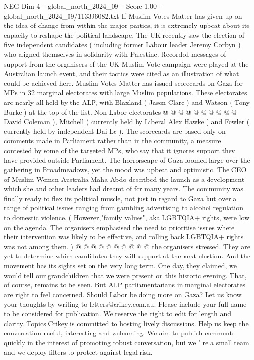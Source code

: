 \begin{textsample}{NEG Dim 4 – global\_north\_2024\_09 – Score 1.00 – global\_north\_2024\_09/113396082.txt}
If Muslim Votes Matter has given up on the idea of change from within the major parties, it is extremely upbeat about its capacity to reshape the political landscape.
The UK recently saw the election of five independent candidates ( including former Labour leader Jeremy Corbyn ) who aligned themselves in solidarity with Palestine.
Recorded messages of support from the organisers of the UK Muslim Vote campaign were played at the Australian launch event, and their tactics were cited as an illustration of what could be achieved here.
Muslim Votes Matter has issued scorecards on Gaza for MPs in 32 marginal electorates with large Muslim populations.
These electorates are nearly all held by the ALP, with Blaxland ( Jason Clare ) and Watson ( Tony Burke ) at the top of the list.
Non-Labor electorates @ @ @ @ @ @ @ @ @ @ David Coleman ), Mitchell ( currently held by Liberal Alex Hawke ) and Fowler ( currently held by independent Dai Le ).
The scorecards are based only on comments made in Parliament rather than in the community, a measure contested by some of the targeted MPs, who say that it ignores support they have provided outside Parliament.
The horrorscape of Gaza loomed large over the gathering in Broadmeadows, yet the mood was upbeat and optimistic.
The CEO of Muslim Women Australia Maha Abdo described the launch as a development which she and other leaders had dreamt of for many years.
The community was finally ready to flex its political muscle, not just in regard to Gaza but over a range of political issues ranging from gambling advertising to alcohol regulation to domestic violence. ( However,"family values", aka LGBTQIA+ rights, were low on the agenda.
The organisers emphasised the need to prioritise issues where their intervention was likely to be effective, and rolling back LGBTQIA+ rights was not among them. ) @ @ @ @ @ @ @ @ @ @ the organisers stressed.
They are yet to determine which candidates they will support at the next election.
And the movement has its sights set on the very long term.
One day, they claimed, we would tell our grandchildren that we were present on this historic evening.
That, of course, remains to be seen.
But ALP parliamentarians in marginal electorates are right to feel concerned.
Should Labor be doing more on Gaza?
Let us know your thoughts by writing to letters@crikey.com.au.
Please include your full name to be considered for publication.
We reserve the right to edit for length and clarity.
Topics Crikey is committed to hosting lively discussions.
Help us keep the conversation useful, interesting and welcoming.
We aim to publish comments quickly in the interest of promoting robust conversation, but we ' re a small team and we deploy filters to protect against legal risk.

\end{textsample}
